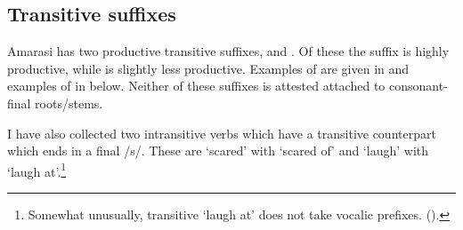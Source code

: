 \subsection{Transitive suffixes}\label{sec:TraSuf}
Amarasi has two productive transitive suffixes,  and .
Of these the suffix  is highly productive,
while  is slightly less productive.
Examples of  are given in 
and examples of  in  below.
Neither of these suffixes is attested attached to consonant-final roots/stems.

\begin{exe}
	\label{ex:TraSuf-b}
\end{exe}

\begin{exe}
	\label{ex:TraSuf-q}
\end{exe}

I have also collected two intransitive verbs which
have a transitive counterpart which ends in a final /s/.
These are  `scared' with  `scared of'
and  `laugh' with  `laugh at'.\footnote{
		Somewhat unusually, transitive  `laugh at'
		does not take vocalic prefixes. ().}

